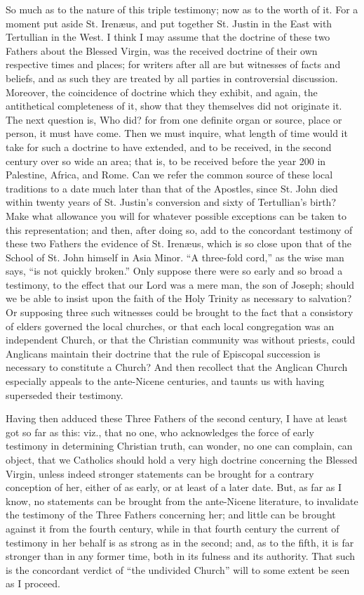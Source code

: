 So much as to the nature of this triple testimony; now as to the
worth of it. For a moment put aside St. Irenæus, and put together St.
Justin in the East with Tertullian in the West. I think I may assume
that the doctrine of these two Fathers about the Blessed Virgin, was the
received doctrine of their own respective times and places; for writers
after all are but witnesses of facts and beliefs, and as such they are
treated by all parties in controversial discussion. Moreover, the
coincidence of doctrine which they exhibit, and again, the antithetical
completeness of it, show that they themselves did not originate it. The
next question is, Who did? for from one definite organ or source, place
or person, it must have come. Then we must inquire, what length of time
would it take for such a doctrine to have extended, and to be
received, in the second century over so wide an area; that is, to be
received before the year 200 in Palestine, Africa, and Rome. Can we
refer the common source of these local traditions to a date much later
than that of the Apostles, since St. John died within twenty years of
St. Justin's conversion and sixty of Tertullian's birth? Make what
allowance you will for whatever possible exceptions can be taken to this
representation; and then, after doing so, add to the concordant
testimony of these two Fathers the evidence of St. Irenæus, which is so
close upon that of the School of St. John himself in Asia Minor. ``A
three-fold cord,'' as the wise man says, ``is not quickly
broken.'' Only suppose there were so early and so broad a testimony,
to the effect that our Lord was a mere man, the son of Joseph; should we
be able to insist upon the faith of the Holy Trinity as necessary to
salvation? Or supposing three such witnesses could be brought to the
fact that a consistory of elders governed the local churches, or that
each local congregation was an independent Church, or that the Christian
community was without priests, could Anglicans maintain their doctrine
that the rule of Episcopal succession is necessary to constitute a
Church? And then recollect that the Anglican Church especially appeals
to the ante-Nicene centuries, and taunts us with having superseded their
testimony.

Having then adduced these Three Fathers of the second century, I have
at least got so far as this: viz., that no one, who acknowledges the
force of early testimony in determining Christian truth, can wonder, no
one can complain, can object, that we Catholics should hold a very
high doctrine concerning the Blessed Virgin, unless indeed stronger
statements can be brought for a contrary conception of her, either of as
early, or at least of a later date. But, as far as I know, no statements
can be brought from the ante-Nicene literature, to invalidate the
testimony of the Three Fathers concerning her; and little can be brought
against it from the fourth century, while in that fourth century the
current of testimony in her behalf is as strong as in the second; and,
as to the fifth, it is far stronger than in any former time, both in its
fulness and its authority. That such is the concordant verdict of
``the undivided Church'' will to some extent be seen as I
proceed.

